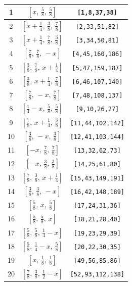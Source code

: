 \documentclass[fleqn,8pt]{jsarticle}
\begin{document}
\begin{longtable}{ccc}
1 & $\left[ x,\, \frac{5}{8},\, \frac{5}{8} \right]$ & {\tt [1,8,37,38]} \\ \hline
2 & $\left[ x + \frac{1}{4},\, \frac{3}{8},\, \frac{7}{8} \right]$ & {\tt [2,33,51,82]} \\ \hline
3 & $\left[ x + \frac{1}{4},\, \frac{7}{8},\, \frac{3}{8} \right]$ & {\tt [3,34,50,81]} \\ \hline
4 & $\left[ \frac{7}{8},\, \frac{7}{8},\, - x \right]$ & {\tt [4,45,160,186]} \\ \hline
5 & $\left[ \frac{3}{8},\, \frac{7}{8},\, x + \frac{1}{4} \right]$ & {\tt [5,47,159,187]} \\ \hline
6 & $\left[ \frac{3}{8},\, x + \frac{1}{4},\, \frac{7}{8} \right]$ & {\tt [6,46,107,140]} \\ \hline
7 & $\left[ \frac{7}{8},\, - x,\, \frac{7}{8} \right]$ & {\tt [7,48,108,137]} \\ \hline
8 & $\left[ \frac{1}{4} - x,\, \frac{5}{8},\, \frac{5}{8} \right]$ & {\tt [9,10,26,27]} \\ \hline
9 & $\left[ \frac{7}{8},\, x + \frac{1}{4},\, \frac{3}{8} \right]$ & {\tt [11,44,102,142]} \\ \hline
10 & $\left[ \frac{3}{8},\, - x,\, \frac{3}{8} \right]$ & {\tt [12,41,103,144]} \\ \hline
11 & $\left[ - x,\, \frac{7}{8},\, \frac{7}{8} \right]$ & {\tt [13,32,62,73]} \\ \hline
12 & $\left[ - x,\, \frac{3}{8},\, \frac{3}{8} \right]$ & {\tt [14,25,61,80]} \\ \hline
13 & $\left[ \frac{7}{8},\, \frac{3}{8},\, x + \frac{1}{4} \right]$ & {\tt [15,43,149,191]} \\ \hline
14 & $\left[ \frac{3}{8},\, \frac{3}{8},\, - x \right]$ & {\tt [16,42,148,189]} \\ \hline
15 & $\left[ \frac{5}{8},\, x,\, \frac{5}{8} \right]$ & {\tt [17,24,31,36]} \\ \hline
16 & $\left[ \frac{5}{8},\, \frac{5}{8},\, x \right]$ & {\tt [18,21,28,40]} \\ \hline
17 & $\left[ \frac{5}{8},\, \frac{5}{8},\, \frac{1}{4} - x \right]$ & {\tt [19,23,29,39]} \\ \hline
18 & $\left[ \frac{5}{8},\, \frac{1}{4} - x,\, \frac{5}{8} \right]$ & {\tt [20,22,30,35]} \\ \hline
19 & $\left[ x,\, \frac{1}{8},\, \frac{1}{8} \right]$ & {\tt [49,56,85,86]} \\ \hline
20 & $\left[ \frac{7}{8},\, \frac{3}{8},\, \frac{1}{2} - x \right]$ & {\tt [52,93,112,138]} \\ \hline

\end{longtable}
\end{document}
